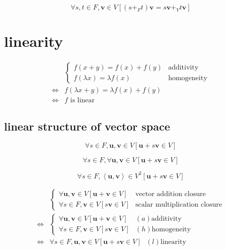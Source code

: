 \documentclass[
]{book}
\theoremstyle{definition}
\theoremstyle{definition}
\theoremstyle{definition}
\theoremstyle{definition}
\theoremstyle{remark}
\begin{document}
\[
\forall s,t\in F,\boldsymbol{v}\in V\left[\left(s+_{{\scriptscriptstyle F}}t\right)\boldsymbol{v}=s\boldsymbol{v}+_{{\scriptscriptstyle V}}t\boldsymbol{v}\right]
\]

\hypertarget{linearity}{%
\section{linearity}\label{linearity}}

\[
\begin{aligned}
 & \begin{cases}
f\left(x+y\right)=f\left(x\right)+f\left(y\right) & \text{additivity}\\
f\left(\lambda x\right)=\lambda f\left(x\right) & \text{homogeneity}
\end{cases}\\
\Leftrightarrow & f\left(\lambda x+y\right)=\lambda f\left(x\right)+f\left(y\right)\\
\Leftrightarrow & f\text{ is linear}
\end{aligned}
\]

\hypertarget{linear-structure-of-vector-space}{%
\subsection{linear structure of vector space}\label{linear-structure-of-vector-space}}

\[
\forall s\in F,\boldsymbol{u},\boldsymbol{v}\in V\left[\boldsymbol{u}+s\boldsymbol{v}\in V\right]
\]

\[
\forall s\in F,\forall\boldsymbol{u},\boldsymbol{v}\in V\left[\boldsymbol{u}+s\boldsymbol{v}\in V\right]
\]

\[
\forall s\in F,\left\langle \boldsymbol{u},\boldsymbol{v}\right\rangle \in V^{2}\left[\boldsymbol{u}+s\boldsymbol{v}\in V\right]
\]

\[
\begin{aligned}
 & \begin{cases}
\forall\boldsymbol{u},\boldsymbol{v}\in V\left[\boldsymbol{u}+\boldsymbol{v}\in V\right] & \text{vector addition closure}\\
\forall s\in F,\boldsymbol{v}\in V\left[s\boldsymbol{v}\in V\right] & \text{scalar multiplication closure}
\end{cases}\\
\Leftrightarrow & \begin{cases}
\forall\boldsymbol{u},\boldsymbol{v}\in V\left[\boldsymbol{u}+\boldsymbol{v}\in V\right] & \left(a\right)\text{additivity}\\
\forall s\in F,\boldsymbol{v}\in V\left[s\boldsymbol{v}\in V\right] & \left(h\right)\text{homogeneity}
\end{cases}\\
\Leftrightarrow & \forall s\in F,\boldsymbol{u},\boldsymbol{v}\in V\left[\boldsymbol{u}+s\boldsymbol{v}\in V\right]\text{ }\left(l\right)\text{linearity}
\end{aligned}
\]
\end{document}
